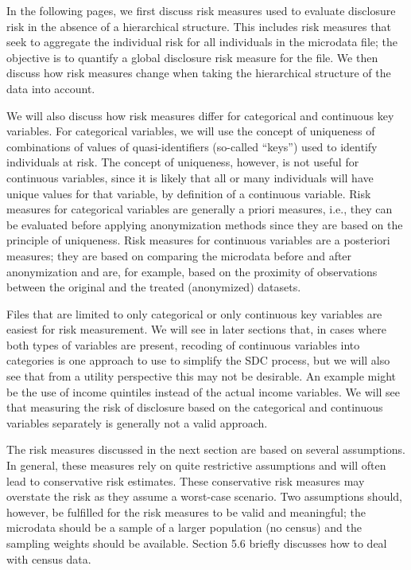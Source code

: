 \documentclass[letterpaper,10pt,english]{sphinxmanual}
\begin{document}
In the following pages, we first discuss risk measures used to evaluate
disclosure risk in the absence of a hierarchical structure. This
includes risk measures that seek to aggregate the individual risk for
all individuals in the microdata file; the objective is to quantify a
global disclosure risk measure for the file. We then discuss how risk
measures change when taking the hierarchical structure of the data into
account.

We will also discuss how risk measures differ for categorical and
continuous key variables. For categorical variables, we will use the
concept of uniqueness of combinations of values of quasi-identifiers
(so-called “keys”) used to identify individuals at risk. The concept of
uniqueness, however, is not useful for continuous variables, since it is
likely that all or many individuals will have unique values for that
variable, by definition of a continuous variable. Risk measures for
categorical variables are generally a priori measures, i.e., they can be
evaluated before applying anonymization methods since they are based on
the principle of uniqueness. Risk measures for continuous variables are
a posteriori measures; they are based on comparing the microdata before
and after anonymization and are, for example, based on the proximity of
observations between the original and the treated (anonymized) datasets.

Files that are limited to only categorical or only continuous key
variables are easiest for risk measurement. We will see in later
sections that, in cases where both types of variables are present,
recoding of continuous variables into categories is one approach to use
to simplify the SDC process, but we will also see that from a utility
perspective this may not be desirable. An example might be the use of
income quintiles instead of the actual income variables. We will see
that measuring the risk of disclosure based on the categorical and
continuous variables separately is generally not a valid approach.

The risk measures discussed in the next section are based on several
assumptions. In general, these measures rely on quite restrictive
assumptions and will often lead to conservative risk estimates. These
conservative risk measures may overstate the risk as they assume a
worst-case scenario. Two assumptions should, however, be fulfilled for
the risk measures to be valid and meaningful; the microdata should be a
sample of a larger population (no census) and the sampling weights
should be available. Section 5.6 briefly discusses how to deal with
census data.
\end{document}
